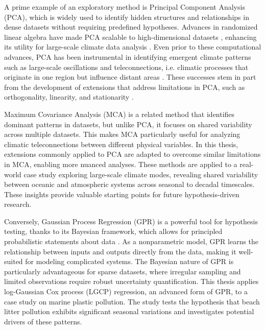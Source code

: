 A prime example of an exploratory method is Principal Component Analysis (PCA), which is widely used to identify hidden structures and relationships in dense datasets without requiring predefined hypotheses. Advances in randomized linear algebra have made PCA scalable to high-dimensional datasets \cite{halko_finding_2011, erichson_sparse_2020}, enhancing its utility for large-scale climate data analysis \cite{velegar_scalable_2019}. Even prior to these computational advances, PCA has been instrumental in identifying emergent climate patterns such as large-scale oscillations and teleconnections, i.e. climatic processes that originate in one region but influence distant areas \cite[e.g.][]{hannachi_patterns_2021}. These successes stem in part from the development of extensions that address limitations in PCA, such as orthogonality, linearity, and stationarity \cite{hannachi_patterns_2021}.

Maximum Covariance Analysis (MCA) is a related method that identifies dominant patterns in datasets, but unlike PCA, it focuses on shared variability across multiple datasets. This makes MCA particularly useful for analyzing climatic teleconnections between different physical variables. In this thesis, extensions commonly applied to PCA are adapted to overcome similar limitations in MCA, enabling more nuanced analyses. These methods are applied to a real-world case study exploring large-scale climate modes, revealing shared variability between oceanic and atmospheric systems across seasonal to decadal timescales. These insights provide valuable starting points for future hypothesis-driven research.

Conversely, Gaussian Process Regression (GPR) is a powerful tool for hypothesis testing, thanks to its Bayesian framework, which allows for principled probabilistic statements about data \cite{rasmussen_gaussian_2006}. As a nonparametric model, GPR learns the relationship between inputs and outputs directly from the data, making it well-suited for modeling complicated systems. The Bayesian nature of GPR is particularly advantageous for sparse datasets, where irregular sampling and limited observations require robust uncertainty quantification. This thesis applies log-Gaussian Cox process (LGCP) regression, an advanced form of GPR, to a case study on marine plastic pollution. The study tests the hypothesis that beach litter pollution exhibits significant seasonal variations and investigates potential drivers of these patterns.

